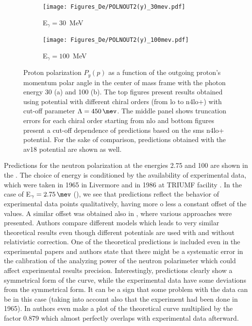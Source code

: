     \begin{figure}[h]
        \centering
        \begin{subfigure}[b]{0.46\textwidth}
            \caption{\small E$_\gamma = 30$~MeV}
            \texttt{[image: Figures\_De/POLNOUT2(y)\_30mev.pdf]}
            \label{PY_30_vert}
        \end{subfigure}
        \begin{subfigure}[b]{0.46\textwidth}
            \caption{\small E$_\gamma = 100$~MeV}
            \texttt{[image: Figures\_De/POLNOUT2(y)\_100mev.pdf]}
            \label{PY_100_vert}
        \end{subfigure}
        \caption{Proton polarization $P_y(p)$ 
        \label{PY_30_100_vert}
        as a function of the outgoing proton's momentum polar angle in the center of mass frame 
        with the photon energy \SI{30}{\mev} (a) and \SI{100}{\mev} (b).
        The top figures present results obtained using potential
        with different chiral orders (from \gls{lo} to \gls{n4lo+}) with cut-off parameter $\Lambda=\SI{450}{\mev}$.
        The middle panel shows truncation errors for each 
        chiral order starting from \gls{nlo} and
        bottom figures present a cut-off dependence of predictions
        based on the \gls{sms} \gls{n4lo+} potential.
        For the sake of comparison, predictions obtained with the \gls*{av18} potential 
        are shown as well.}
    \end{figure}



    Predictions for the neutron polarization at the energies \SI{2.75}{\mev} and \SI{100}{\mev} are shown in the
    . The choice of energy is conditioned by the availability of experimental data,
    which were taken in 1965 in Livermore \cite{Jewell_neuteronpolarization} and 
    in 1986 at TRIUMF facility \cite{CAMERON_neuteronpolarization}.
    In the case of E$_\gamma = \SI{2.75}{\mev}$ (), we see that predictions reflect
    the behavior of experimental data points qualitatively,
    having more o less a constant offset of the values. A similar offset was obtained
    also in \cite{ArenhovelPhotodisint1991}, where various approaches were presented.
    Authors compare different models which leads to very similar theoretical results
    even though different potentials are used with and without relativistic correction.
    One of the theoretical predictions is included even in the experimental papers
    \cite{Jewell_neuteronpolarization} and authors state that there might be a
    systematic error in the calibration of the analyzing power
    of the neutron polarimeter which could affect experimental results precision.
    Interestingly, predictions clearly show a symmetrical form of the curve, while the experimental data
    have some deviations from the symmetrical form. It can be a sign that some problem with the data can be
    in this case (taking into account also that the experiment had been done in 1965).
    In \cite{Jewell_neuteronpolarization} authors even make a plot of the theoretical curve
    multiplied by the factor 0.879 which almost perfectly overlaps with experimental data afterward. 

